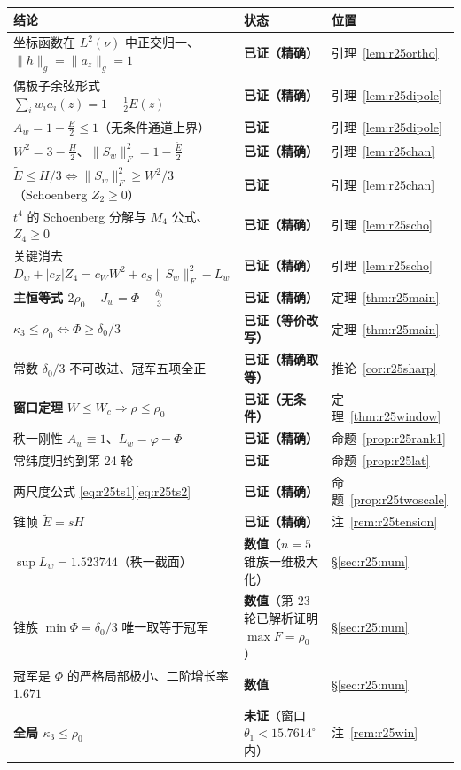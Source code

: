 \documentclass[UTF8,11pt]{ctexart}
\theoremstyle{definition}
\begin{document}
\begin{center}\small
\begin{tabular}{lll}
\toprule
结论 & 状态 & 位置\\
\midrule
坐标函数在 $L^2(\nu)$ 中正交归一、$\|h\|_g=\|a_z\|_g=1$ & \textbf{已证（精确）} & 引理~\ref{lem:r25ortho}\\
偶极子余弦形式 $\sum_iw_ia_i(z)=1-\frac12E(z)$ & \textbf{已证（精确）} & 引理~\ref{lem:r25dipole}\\
\textbf{$A_w=1-\frac E2\le1$}（无条件通道上界） & \textbf{已证} & 引理~\ref{lem:r25dipole}\\
$W^2=3-\frac H2$、$\|S_w\|_F^2=1-\frac{\widetilde E}2$ & \textbf{已证（精确）} & 引理~\ref{lem:r25chan}\\
$\widetilde E\le H/3\iff\|S_w\|_F^2\ge W^2/3$（Schoenberg $Z_2\ge0$） & \textbf{已证} & 引理~\ref{lem:r25chan}\\
$t^4$ 的 Schoenberg 分解与 $M_4$ 公式、$Z_4\ge0$ & \textbf{已证（精确）} & 引理~\ref{lem:r25scho}\\
关键消去 $D_w+|c_Z|Z_4=c_WW^2+c_S\|S_w\|_F^2-L_w$ & \textbf{已证（精确）} & 引理~\ref{lem:r25scho}\\
\textbf{主恒等式 $2\rho_0-J_w=\Phi-\frac{\delta_0}3$} & \textbf{已证（精确）} & 定理~\ref{thm:r25main}\\
$\kappa_3\le\rho_0\iff\Phi\ge\delta_0/3$ & \textbf{已证（等价改写）} & 定理~\ref{thm:r25main}\\
常数 $\delta_0/3$ 不可改进、冠军五项全正 & \textbf{已证（精确取等）} & 推论~\ref{cor:r25sharp}\\
\textbf{窗口定理} $W\le W_c\Rightarrow\rho\le\rho_0$ & \textbf{已证（无条件）} & 定理~\ref{thm:r25window}\\
秩一刚性 $A_w\equiv1$、$L_w=\varphi-\Phi$ & \textbf{已证（精确）} & 命题~\ref{prop:r25rank1}\\
常纬度归约到第 24 轮 & \textbf{已证} & 命题~\ref{prop:r25lat}\\
两尺度公式 \eqref{eq:r25ts1}\eqref{eq:r25ts2} & \textbf{已证（精确）} & 命题~\ref{prop:r25twoscale}\\
锥帧 $\widetilde E=sH$ & \textbf{已证（精确）} & 注~\ref{rem:r25tension}\\
$\sup L_w=1.523744$（秩一截面） & \textbf{数值}（$n=5$ 锥族一维极大化） & \S\ref{sec:r25:num}\\
锥族 $\min\Phi=\delta_0/3$ 唯一取等于冠军 & \textbf{数值}（第 23 轮已解析证明 $\max F=\rho_0$） & \S\ref{sec:r25:num}\\
冠军是 $\Phi$ 的严格局部极小、二阶增长率 $1.671$ & \textbf{数值} & \S\ref{sec:r25:num}\\
\textbf{全局 $\kappa_3\le\rho_0$} & \textbf{未证}（窗口 $\theta_1<15.7614^\circ$ 内） & 注~\ref{rem:r25win}\\
\bottomrule
\end{tabular}
\end{center}
\end{document}
